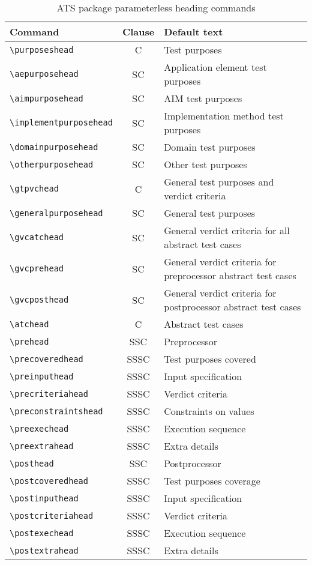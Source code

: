 \documentclass[wd,copyright,letterpaper]{isov2}
\newlength{\prwlen}
\begin{document}
{{{\settowidth{\prwlen}{\quad General verdict criteria for all abstract}
\begin{table}
\centering
\caption{ATS package parameterless heading commands} \label{tab:atshead}
\begin{tabular}{|l|c|p{\prwlen}|} \hline
\textbf{Command}             & \textbf{Clause} & \textbf{Default text} \\ \hline
\verb|\purposeshead|         & C   & Test purposes  \\
\verb|\aepurposehead|        & SC  & Application element test purposes \\
\verb|\aimpurposehead|       & SC  & AIM test purposes \\
\verb|\implementpurposehead| & SC  & Implementation method test purposes \\
\verb|\domainpurposehead|    & SC  & Domain test purposes \\
\verb|\otherpurposehead|     & SC  & Other test purposes \\

\verb|\gtpvchead|            & C   & General test purposes and verdict criteria \\
\verb|\generalpurposehead|   & SC  & General test purposes \\
\verb|\gvcatchead|           & SC  & General verdict criteria for all abstract test cases \\
\verb|\gvcprehead|           & SC  & General verdict criteria for preprocessor abstract test cases \\
\verb|\gvcposthead|          & SC  & General verdict criteria for postprocessor abstract test cases \\

\verb|\atchead|              & C   & Abstract test cases \\
\verb|\prehead|              & SSC & Preprocessor \\
\verb|\precoveredhead|       & SSSC & Test purposes covered \\
\verb|\preinputhead|         & SSSC & Input specification \\
\verb|\precriteriahead|      & SSSC & Verdict criteria \\
\verb|\preconstraintshead|   & SSSC & Constraints on values \\
\verb|\preexechead|          & SSSC & Execution sequence \\
\verb|\preextrahead|         & SSSC & Extra details \\


\verb|\posthead|             & SSC & Postprocessor \\
\verb|\postcoveredhead|       & SSSC & Test purposes coverage \\
\verb|\postinputhead|         & SSSC & Input specification \\
\verb|\postcriteriahead|      & SSSC & Verdict criteria \\
\verb|\postexechead|          & SSSC & Execution sequence \\
\verb|\postextrahead|         & SSSC & Extra details \\


\end{tabular}
\end{table}}}}
\end{document}
